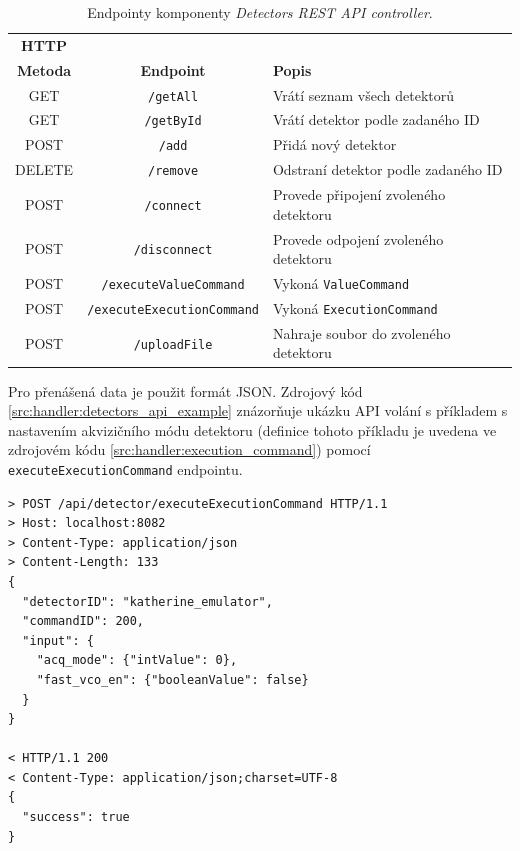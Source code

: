\begin{table}[h]
	\begin{center}
		\begin{tabular}{|c|c|l|}
			\hline
      \textbf{HTTP} & & \\
      \textbf{Metoda} & \textbf{Endpoint} & \textbf{Popis} \\
			\hline
      GET & \texttt{/getAll} & Vrátí seznam všech detektorů \\
      GET & \texttt{/getById} & Vrátí detektor podle zadaného ID \\
      POST & \texttt{/add} & Přidá nový detektor \\
      DELETE & \texttt{/remove} & Odstraní detektor podle zadaného ID \\
      POST & \texttt{/connect} & Provede připojení zvoleného detektoru \\
      POST & \texttt{/disconnect} & Provede odpojení zvoleného detektoru \\
      POST & \texttt{/executeValueCommand} & Vykoná \texttt{ValueCommand} \\
      POST & \texttt{/executeExecutionCommand} & Vykoná \texttt{ExecutionCommand} \\
      POST & \texttt{/uploadFile} & Nahraje soubor do zvoleného detektoru \\
			\hline
		\end{tabular}
	\end{center}
	\caption{Endpointy komponenty \textit{Detectors REST API controller}.}
	\label{tab:handler:api_detectors}
\end{table}

Pro přenášená data je použit formát JSON. Zdrojový kód \ref{src:handler:detectors_api_example} znázorňuje ukázku API volání s příkladem s nastavením akvizičního módu detektoru (definice tohoto příkladu je uvedena ve zdrojovém kódu \ref{src:handler:execution_command}) pomocí \texttt{executeExecutionCommand} endpointu.

\begin{code}[h!]
\begin{verbatim}
> POST /api/detector/executeExecutionCommand HTTP/1.1
> Host: localhost:8082
> Content-Type: application/json
> Content-Length: 133
{
  "detectorID": "katherine_emulator",
  "commandID": 200,
  "input": {
    "acq_mode": {"intValue": 0},
    "fast_vco_en": {"booleanValue": false}
  }
}

< HTTP/1.1 200 
< Content-Type: application/json;charset=UTF-8
{
  "success": true
}
\end{verbatim}
\caption{Příklad volání API komponenty pro správu detektorů. V příkladu na řádcích 1 až 12 je \textit{request} pro vykonání \texttt{ExecutionCommand} pro nastavení akvizičního módu detektoru a na řádcích 14 až 18 je \textit{response} serveru.}
\label{src:handler:detectors_api_example}
\end{code}

